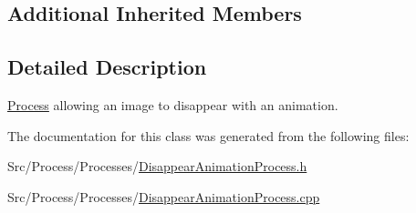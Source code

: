 \subsection*{Additional Inherited Members}


\subsection{Detailed Description}
\hyperlink{classProcess}{Process} allowing an image to disappear with an animation. 

The documentation for this class was generated from the following files\-:\begin{DoxyCompactItemize}
\item 
Src/\-Process/\-Processes/\hyperlink{DisappearAnimationProcess_8h}{Disappear\-Animation\-Process.\-h}\item 
Src/\-Process/\-Processes/\hyperlink{DisappearAnimationProcess_8cpp}{Disappear\-Animation\-Process.\-cpp}\end{DoxyCompactItemize}
